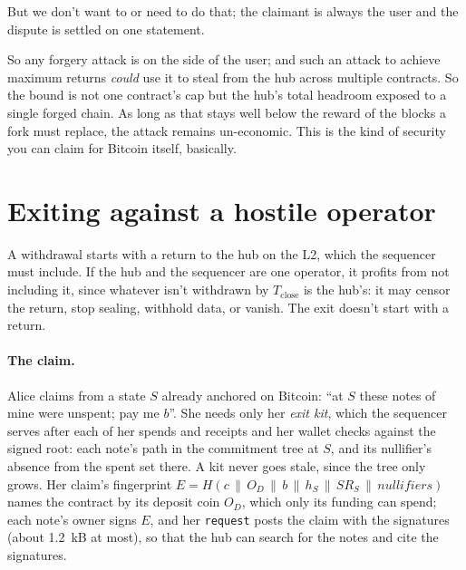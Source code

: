 \documentclass[11pt]{article}
\newcommand{\Tc}{T_{\mathrm{close}}}
\newcommand{\tx}[1]{\texttt{#1}}
\begin{document}
But we don't want to or need to do that; the claimant is always the user and the dispute is settled on one statement.

So any forgery attack is on the side of the user; and such an attack to achieve maximum returns \emph{could} use it to steal from the hub across multiple contracts.
So the bound is not one contract's cap but
the hub's total headroom exposed to a single forged chain. As long as
that stays well below the reward of the blocks a fork must replace, the attack remains un-economic. This is the kind of security you can claim for Bitcoin itself, basically.

\section{Exiting against a hostile operator}
\label{sec:exit}

A withdrawal starts with a return to the hub on the L2, which the
sequencer must include. If the hub and the sequencer are one operator,
it profits from not including it, since whatever isn't withdrawn by
$\Tc$ is the hub's: it may censor the return, stop sealing, withhold
data, or vanish. The exit doesn't start with a return.

\paragraph{The claim.} Alice claims from a state $S$ already anchored on
Bitcoin: ``at $S$ these notes of mine were unspent; pay me $b$''. She
needs only her \emph{exit kit}, which the sequencer serves after each of
her spends and receipts and her wallet checks against the signed root:
each note's path in the commitment tree at $S$, and its nullifier's
absence from the spent set there. A kit never goes stale, since the tree
only grows. Her claim's fingerprint
$E = H(c \,\|\, O_D \,\|\, b \,\|\, h_S \,\|\, \mathit{SR}_S \,\|\, \mathit{nullifiers})$
names the contract by its deposit coin $O_D$, which only its funding can
spend; each note's owner signs $E$, and her \tx{request} posts the claim
with the signatures (about 1.2~kB at most), so that the hub can search
for the notes and cite the signatures.
\end{document}
